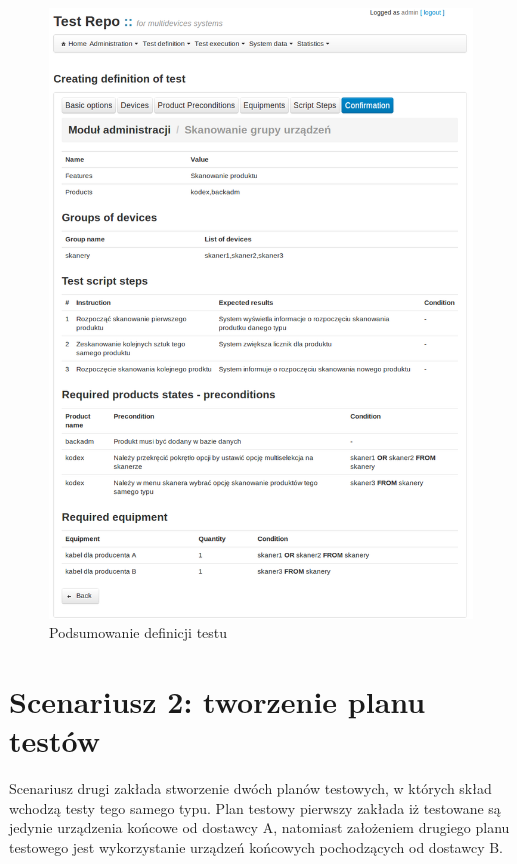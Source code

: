   \begin{figure}[h]
  \begin{center}
    \includegraphics[scale=0.4]{img/screen/tworzenieTestuPodsumowanie.png}
    \caption{Podsumowanie definicji testu}
    \label{fig:podsumowanieTestu}
  \end{center}
\end{figure}

\section{Scenariusz 2: tworzenie planu testów}

Scenariusz drugi zakłada stworzenie dwóch planów testowych, w których skład wchodzą testy tego samego typu. Plan testowy pierwszy zakłada iż testowane są jedynie urządzenia końcowe od dostawcy A, natomiast założeniem drugiego planu testowego jest wykorzystanie urządzeń końcowych pochodzących od dostawcy B.

